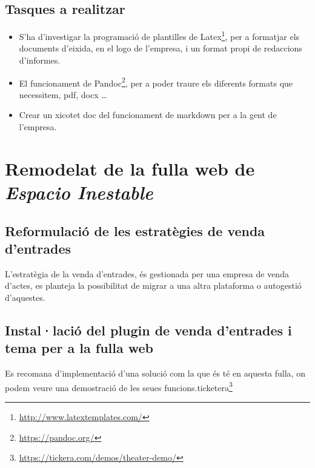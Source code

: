 \documentclass[
  10pt,
]{krantz}
\DeclareRobustCommand{\href}[2]{#2\footnote{\url{#1}}}
\providecommand{\tightlist}{%
  \setlength{\itemsep}{0pt}\setlength{\parskip}{0pt}}
\begin{document}
\hypertarget{tasques-a-realitzar}{%
\section{Tasques a realitzar}\label{tasques-a-realitzar}}

\begin{itemize}
\tightlist
\item
  S'ha d'investigar la programació de plantilles de \href{http://www.latextemplates.com/}{Latex}, per a formatjar els documents d'eixida, en el logo de l'empresa, i un format propi de redaccions d'informes.
\item
  El funcionament de \href{https://pandoc.org/}{Pandoc}, per a poder traure els diferents formats que necessitem, pdf, docx \ldots{}
\item
  Crear un xicotet doc del funcionament de markdown per a la gent de l'empresa.
\end{itemize}

\hypertarget{remodelat-de-la-fulla-web-de-espacio-inestable}{%
\chapter{\texorpdfstring{Remodelat de la fulla web de \emph{Espacio Inestable}}{Remodelat de la fulla web de Espacio Inestable}}\label{remodelat-de-la-fulla-web-de-espacio-inestable}}

\hypertarget{reformulaciuxf3-de-les-estratuxe8gies-de-venda-dentrades}{%
\section{Reformulació de les estratègies de venda d'entrades}\label{reformulaciuxf3-de-les-estratuxe8gies-de-venda-dentrades}}

L'estratègia de la venda d'entrades, és gestionada per una empresa de venda d'actes, es planteja la possibilitat de migrar a una altra plataforma o autogestió d'aquestes.

\hypertarget{installaciuxf3-del-plugin-de-venda-dentrades-i-tema-per-a-la-fulla-web}{%
\section{Instal·lació del plugin de venda d'entrades i tema per a la fulla web}\label{installaciuxf3-del-plugin-de-venda-dentrades-i-tema-per-a-la-fulla-web}}

Es recomana d'implementació d'una solució com la que és té en aquesta fulla, on podem veure una demostració de les seues funcions.\href{https://tickera.com/demos/theater-demo/}{ticketera}
\end{document}
